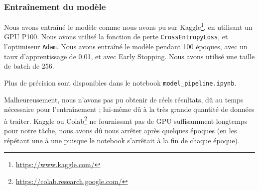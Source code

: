 \subsubsection{Entraînement du modèle}
\label{subsubsec:train}
Nous avons entraîné le modèle comme nous avons pu sur Kaggle\footnote{\url{https://www.kaggle.com/}}, en utilisant un GPU P100. Nous avons utilisé la fonction de perte \texttt{CrossEntropyLoss}, et l'optimiseur \texttt{Adam}. Nous avons entraîné le modèle pendant 100 époques, avec un taux d'apprentissage de 0.01, et avec Early Stopping. Nous avons utilisé une taille de batch de 256.

Plus de précision sont disponibles dans le notebook \texttt{model\_pipeline.ipynb}.

Malheureusement, nous n'avons pas pu obtenir de réels résultats, dû au temps nécessaire pour l'entraînement ; lui-même dû à la très grande quantité de données à traiter. Kaggle ou Colab\footnote{\url{https://colab.research.google.com/}} ne fournissant pas de GPU suffisamment longtemps pour notre tâche, nous avons dû nous arrêter après quelques époques (en les répétant une à une puisque le notebook s'arrêtait à la fin de chaque époque).